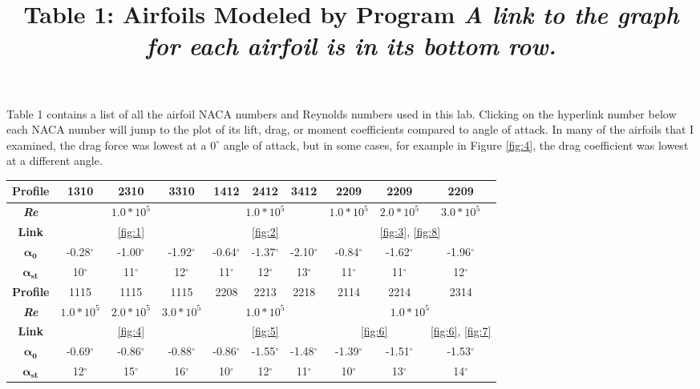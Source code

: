 \documentclass{article}
\begin{document}
Table 1 contains a list of all the airfoil NACA numbers and Reynolds numbers used in this lab. Clicking on the \color{blue}hyperlink number \color{black} below each NACA number will jump to the plot of its lift, drag, or moment coefficients compared to angle of attack. In many of the airfoils that I examined, the drag force was lowest at a $0^{\circ}$ angle of attack, but in some cases, for example in Figure \ref{fig:4}, the drag coefficient was lowest at a different angle. \newline

\begin{table}[bp]
	\centering
	\title{Table 1: Airfoils Modeled by Program \newline}
	\title{\emph{A link to the graph for each airfoil is in its bottom row.}} \label{table:1}
	\begin{tabular}{ | c | c | c | c | c | c | c | c | c | c |}
		\hline
		 \textbf{Profile} & 1310 & 2310 & 3310 & 1412 & 2412 & 3412 & 2209 & 2209 & 2209 \\ \hline
		 \textbf{\emph{Re}} & \multicolumn{3}{c|}{$1.0*10^5$}  & \multicolumn{3}{c|}{$1.0*10^5$} & $1.0*10^5$ & $2.0*10^5$ & $3.0*10^5$ \\ \hline
		 \textbf{Link} & \multicolumn{3}{c|}{\ref{fig:1}} & \multicolumn{3}{c|}{\ref{fig:2}} & \multicolumn{3}{c|}{\ref{fig:3}, \ref{fig:8}}\\ \hline 
		 $\mathbf{\alpha_{0}}$ & -0.28$^{\circ}$ & -1.00$^{\circ}$ & -1.92$^{\circ}$ & -0.64$^{\circ}$ & -1.37$^{\circ}$ & -2.10$^{\circ}$ & -0.84$^{\circ}$ & -1.62$^{\circ}$ & -1.96$^{\circ}$ \\ \hline
		 $\mathbf{\alpha_{st}}$ & 10$^{\circ}$ & 11$^{\circ}$ & 12$^{\circ}$ & 11$^{\circ}$ & 12$^{\circ}$ & 13$^{\circ}$ & 11$^{\circ}$ & 11$^{\circ}$ & 12$^{\circ}$ \\ \hline \hline
		 \newline
		 \textbf{Profile} & 1115 & 1115 & 1115 & 2208 & 2213 & 2218 & 2114 & 2214 & 2314 \\ \hline
		 \textbf{\emph{Re}} & $1.0*10^5$ & $2.0*10^5$ & $3.0*10^5$ & \multicolumn{3}{c|}{$1.0*10^5$} & \multicolumn{3}{c|}{$1.0*10^5$} \\ \hline
		 \textbf{Link} & \multicolumn{3}{c|}{\ref{fig:4}}& \multicolumn{3}{c|}{\ref{fig:5}} & \multicolumn{2}{c|}{\ref{fig:6}} & \ref{fig:6}, \ref{fig:7} \\ \hline
		 $\mathbf{\alpha_{0}}$ & -0.69$^{\circ}$ & -0.86$^{\circ}$ & -0.88$^{\circ}$ & -0.86$^{\circ}$ & -1.55$^{\circ}$ & -1.48$^{\circ}$ & -1.39$^{\circ}$ & -1.51$^{\circ}$ & -1.53$^{\circ}$ \\ \hline
		 $\mathbf{\alpha_{st}}$ & 12$^{\circ}$ & 15$^{\circ}$ & 16$^{\circ}$ & 10$^{\circ}$ & 12$^{\circ}$ & 11$^{\circ}$ & 10$^{\circ}$ & 13$^{\circ}$ & 14$^{\circ}$ \\ \hline
	\end{tabular}
\end{table}
\end{document}
